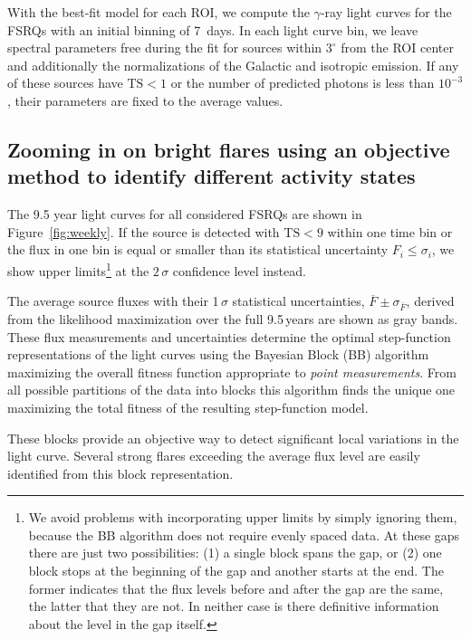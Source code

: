 \documentclass[twocolumn,linenumbers]{aastex62}
\newcommand{\gray}{$\gamma$-ray\xspace}
\begin{document}
With the best-fit model for each ROI, we compute the \gray light curves for the FSRQs with an initial binning of 7~days. 
In each light curve bin, we leave spectral parameters free during the fit for sources within $3^\circ$ from the ROI center and additionally the normalizations of the Galactic and isotropic emission. If any of these sources have $\mathrm{TS} < 1$ or the number of predicted photons is less than $10^{-3}$, their parameters are fixed to the average values.

\subsection{Zooming in on bright flares using an objective method to identify different activity states}
\label{sec:zoom}

The 9.5 year light curves for all considered FSRQs are shown in Figure~\ref{fig:weekly}. If the source is detected with $\mathrm{TS} < 9$ within one time bin or the flux in one bin is equal or smaller than its statistical uncertainty $F_i \leqslant \sigma_i$, we show upper limits\footnote{We avoid 
problems with incorporating upper limits by simply ignoring them, because the BB algorithm does not require evenly spaced data. At these gaps there
are just two possibilities:
(1) a single block spans the gap,
or 
(2) one block stops at the beginning of
the gap and another starts at the end.
The former indicates that the flux levels
before and after the gap are the same,
the latter that they are not.
In neither case is there definitive 
information about the level in the
gap itself.}
at the $2\,\sigma$ confidence level instead.

The average source fluxes with their 1$\,\sigma$ statistical uncertainties, $\overline{F} \pm \sigma_{\overline{F}}$, derived from the likelihood maximization over the full 9.5\,years are shown as gray bands. 
These flux measurements and uncertainties determine the optimal step-function representations of the light curves %
using the Bayesian Block (BB) 
algorithm ~\citep[][]{2013ApJ...764..167S} maximizing the overall fitness function appropriate to \textit{point measurements}.
From all possible partitions of the data into blocks this algorithm finds the unique one maximizing the total fitness of the resulting step-function model.


These blocks provide an objective way to detect significant local variations in the light curve.
Several strong flares exceeding the average flux level are easily identified from this block representation. 
\end{document}
